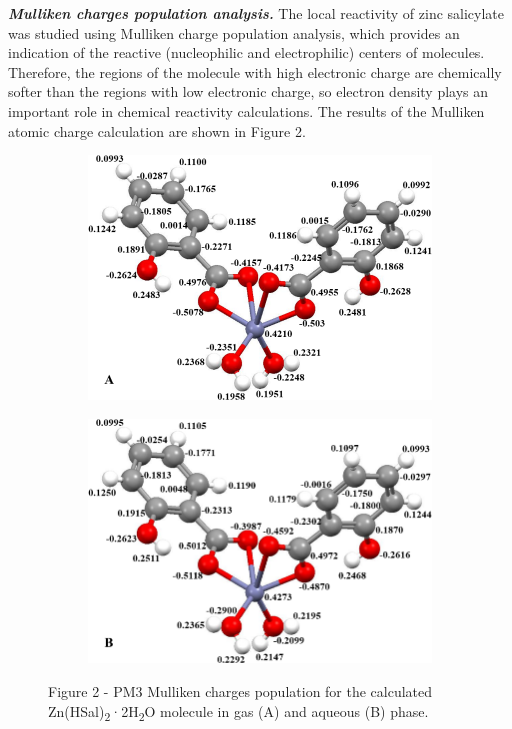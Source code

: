 \begin{multicols}{2}
\emph{{\bfseries Mulliken charges population analysis.}} The local
reactivity of zinc salicylate was studied using Mulliken charge
population analysis, which provides an indication of the reactive
(nucleophilic and electrophilic) centers of molecules. Therefore, the
regions of the molecule with high electronic charge are chemically
softer than the regions with low electronic charge, so electron density
plays an important role in chemical reactivity calculations. The results
of the Mulliken atomic charge calculation are shown in Figure 2.
\end{multicols}

\begin{figure}[H]
    \centering
    \begin{subfigure}[b]{0.4\textwidth}
        \centering
        \includegraphics[width=\textwidth]{assets/39}
    \end{subfigure}
    \hfill
    \begin{subfigure}[b]{0.4\textwidth}
        \centering
        \includegraphics[width=\textwidth]{assets/40}
    \end{subfigure}
    \caption*{Figure 2 - PM3 Mulliken charges population for the calculated Zn(HSal)\textsubscript{2}·2H\textsubscript{2}O molecule in gas (A) and aqueous (B) phase.}
\end{figure}

